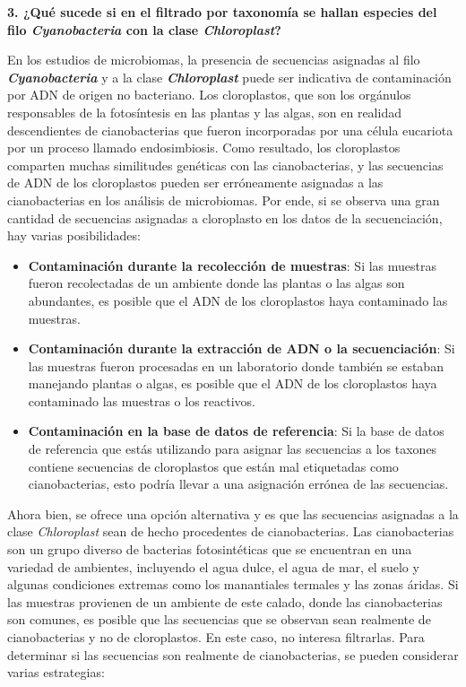 \documentclass[
  letterpaper,
  DIV=11,
  numbers=noendperiod]{scrartcl}
\begin{document}
\textbf{3. ¿Qué sucede si en el filtrado por taxonomía se hallan
especies del filo \emph{Cyanobacteria} con la clase \emph{Chloroplast}?}

En los estudios de microbiomas, la presencia de secuencias asignadas al
filo \textbf{\emph{Cyanobacteria}} y a la clase
\textbf{\emph{Chloroplast}} puede ser indicativa de contaminación por
ADN de origen no bacteriano. Los cloroplastos, que son los orgánulos
responsables de la fotosíntesis en las plantas y las algas, son en
realidad descendientes de cianobacterias que fueron incorporadas por una
célula eucariota por un proceso llamado endosimbiosis. Como resultado,
los cloroplastos comparten muchas similitudes genéticas con las
cianobacterias, y las secuencias de ADN de los cloroplastos pueden ser
erróneamente asignadas a las cianobacterias en los análisis de
microbiomas. Por ende, si se observa una gran cantidad de secuencias
asignadas a cloroplasto en los datos de la secuenciación, hay varias
posibilidades:

\begin{itemize}
\item
  \textbf{Contaminación durante la recolección de muestras}: Si las
  muestras fueron recolectadas de un ambiente donde las plantas o las
  algas son abundantes, es posible que el ADN de los cloroplastos haya
  contaminado las muestras.
\item
  \textbf{Contaminación durante la extracción de ADN o la
  secuenciación}: Si las muestras fueron procesadas en un laboratorio
  donde también se estaban manejando plantas o algas, es posible que el
  ADN de los cloroplastos haya contaminado las muestras o los reactivos.
\item
  \textbf{Contaminación en la base de datos de referencia}: Si la base
  de datos de referencia que estás utilizando para asignar las
  secuencias a los taxones contiene secuencias de cloroplastos que están
  mal etiquetadas como cianobacterias, esto podría llevar a una
  asignación errónea de las secuencias.
\end{itemize}

Ahora bien, se ofrece una opción alternativa y es que las secuencias
asignadas a la clase \emph{Chloroplast} sean de hecho procedentes de
cianobacterias. Las cianobacterias son un grupo diverso de bacterias
fotosintéticas que se encuentran en una variedad de ambientes,
incluyendo el agua dulce, el agua de mar, el suelo y algunas condiciones
extremas como los manantiales termales y las zonas áridas. Si las
muestras provienen de un ambiente de este calado, donde las
cianobacterias son comunes, es posible que las secuencias que se
observan sean realmente de cianobacterias y no de cloroplastos. En este
caso, no interesa filtrarlas. Para determinar si las secuencias son
realmente de cianobacterias, se pueden considerar varias estrategias:
\end{document}
